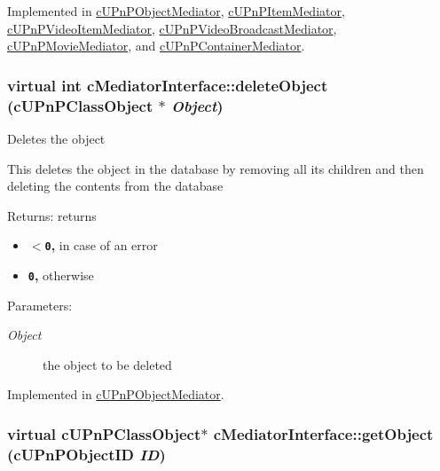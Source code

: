 Implemented in \hyperlink{classcUPnPObjectMediator_bfbca3f1cbadacee2b21306364750f26}{cUPnPObjectMediator}, \hyperlink{classcUPnPItemMediator_e2fd4cf5e6435f1eeadd11f9a99cd2db}{cUPnPItemMediator}, \hyperlink{classcUPnPVideoItemMediator_27e001142c3651c36dfd3b7c450414c0}{cUPnPVideoItemMediator}, \hyperlink{classcUPnPVideoBroadcastMediator_14fefa90807d40d91a80712729af2beb}{cUPnPVideoBroadcastMediator}, \hyperlink{classcUPnPMovieMediator_29d40a311b7283cc4fba36860ac8c935}{cUPnPMovieMediator}, and \hyperlink{classcUPnPContainerMediator_751177c725da94b1b91f6cda4645844d}{cUPnPContainerMediator}.\hypertarget{classcMediatorInterface_ffbddb7fe72554b9cde9d02648cf8f0e}{
\subsubsection[{deleteObject}]{\setlength{\rightskip}{0pt plus 5cm}virtual int cMediatorInterface::deleteObject ({\bf cUPnPClassObject} $\ast$ {\em Object})}}
\label{classcMediatorInterface_ffbddb7fe72554b9cde9d02648cf8f0e}


Deletes the object

This deletes the object in the database by removing all its children and then deleting the contents from the database

\begin{Desc}
\item[Returns:]returns\begin{itemize}
\item {\bf {\tt $<$0},} in case of an error\item {\bf {\tt 0},} otherwise \end{itemize}
\end{Desc}
\begin{Desc}
\item[Parameters:]
\begin{description}
\item[{\em Object}]the object to be deleted \end{description}
\end{Desc}


Implemented in \hyperlink{classcUPnPObjectMediator_0d2f9d72a678002456cbdeccb2c6e5fe}{cUPnPObjectMediator}.\hypertarget{classcMediatorInterface_716ad95bf6ac5a10e9409ced7a63a9d8}{
\subsubsection[{getObject}]{\setlength{\rightskip}{0pt plus 5cm}virtual {\bf cUPnPClassObject}$\ast$ cMediatorInterface::getObject ({\bf cUPnPObjectID} {\em ID})}}
\label{classcMediatorInterface_716ad95bf6ac5a10e9409ced7a63a9d8}


